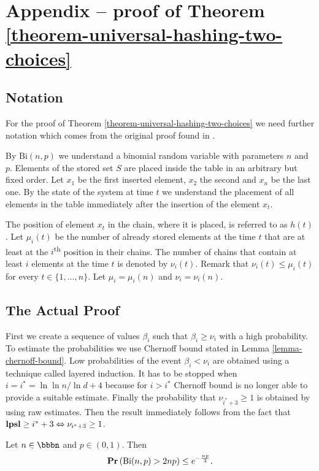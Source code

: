 \section*{Appendix -- proof of Theorem \ref{theorem-universal-hashing-two-choices}}
\subsection{Notation}
For the proof of Theorem \ref{theorem-universal-hashing-two-choices} we need further notation which comes from the original proof found in \cite{Mitzenmacher:2005:PCR:1076315}. 

By $\mathrm{Bi}(n, p)$ we understand a binomial random variable with parameters $n$ and $p$.
Elements of the stored set $S$ are placed inside the table in an arbitrary but fixed order. Let $x_1$ be the first inserted element, $x_2$ the second and $x_n$ be the last one.
By the state of the system at time $t$ we understand the placement of all elements in the table immediately after the insertion of the element $x_t$. 

The position of element $x_t$ in the chain, where it is placed, is referred to as $h(t)$. Let $\mu_i(t)$ be the number of already stored elements at the time $t$ that are at least at the $i$\textsuperscript{th} position in their chains. The number of chains that contain at least $i$ elements at the time $t$ is denoted by $\nu_i(t)$. Remark that $\nu_i(t) \leq \mu_i(t)$ for every $t \in \{1, \dots, n \}$. Let $\mu_i = \mu_i(n)$ and $\nu_i = \nu_i(n)$.

\subsection{The Actual Proof}
First we create a sequence of values $\beta_i$ such that $\beta_i \geq \nu_i$ with a high probability. To estimate the probabilities we use Chernoff bound stated in Lemma \ref{lemma-chernoff-bound}. Low probabilities of the event $\beta_i < \nu_i$ are obtained using a technique called layered induction. It has to be stopped when $i = i^* = \ln \ln n/\ln d + 4$ because for $i > i^*$ Chernoff bound is no longer able to provide a suitable estimate. Finally the probability that $\nu_{i^*+3} \geq 1$ is obtained by using raw estimates. Then the result immediately follows from the fact that $\mathbf{lpsl} \geq i^*+3 \Leftrightarrow \nu_{i^* + 3} \geq 1$.

\begin{lemma}
\label{lemma-chernoff-bound}
Let $n \in \bbbn$ and $p \in (0, 1)$. Then $$\mathbf{Pr}\left(\mathrm{Bi}(n, p) > 2np\right) \leq e ^ {- \frac{np}{3}} \textit{.}$$
\end{lemma}

